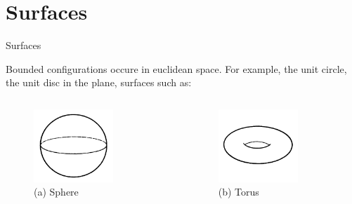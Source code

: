 \documentclass{beamer}
\begin{document}
\section{Surfaces}

\begin{frame}{Surfaces}
  \begin{block}{}
    Bounded configurations occure in euclidean space. For example, the unit circle, the unit disc in the plane, surfaces such as:
  \end{block}
  \begin{columns}
    \begin{column}{0.5\textwidth}
      \begin{figure}
        \centering
        \includegraphics[width=0.7\textwidth]{figure_1_10_a.png}
        \caption{(a) Sphere}
      \end{figure}
    \end{column}
    \begin{column}{0.5\textwidth}
      \begin{figure}
        \centering
        \includegraphics[width=0.7\textwidth]{figure_1_10_b.png}
        \caption{(b) Torus}
      \end{figure}
    \end{column}
  \end{columns}
\end{frame}
\end{document}

